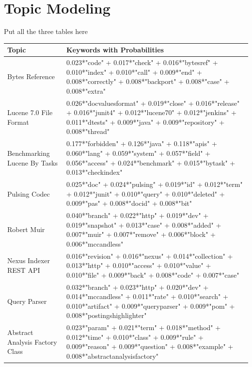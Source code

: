 \documentclass[a4paper,12pt,twoside]{report}
\begin{document}
\section{Topic Modeling}
Put all the three tables here

\begin{table} %
    \centering
    \begin{adjustbox}{max width=\columnwidth}
    \def\arraystretch{1} %
    \begin{tabular}{p{3cm} p{12cm}}
        \toprule
        \textbf{Topic} & \textbf{Keywords with Probabilities}\\
        \midrule
			Bytes Reference & 0.023*"code" + 0.017*"check" + 0.016*"bytesref" + 0.010*"index" + 0.010*"call" + 0.009*"end" + 0.008*"correctly" + 0.008*"backport" + 0.008*"case" + 0.008*"extra" \\
			\midrule 
			Lucene 7.0 File Format & 0.026*"docvaluesformat" + 0.019*"close" + 0.016*"release" + 0.016*"junit4" + 0.012*"lucene70" + 0.012*"jenkins" + 0.011*"dtests" + 0.009*"java" + 0.009*"repository" + 0.008*"thread" \\ 
			\midrule 
			Benchmarking Lucene By Tasks & 0.177*"forbidden" + 0.126*"java" + 0.118*"apis" + 0.060*"lang" + 0.059*"system" + 0.057*"field" + 0.056*"access" + 0.024*"benchmark" + 0.015*"bytask" + 0.013*"checkindex" \\
			\midrule 
			Pulsing Codec & 0.025*"doc" + 0.024*"pulsing" + 0.019*"id" + 0.012*"term" + 0.012*"junit" + 0.010*"query" + 0.010*"deleted" + 0.009*"pas" + 0.008*"docid" + 0.008*"bit" \\
			\midrule 
			Robert Muir & 0.040*"branch" + 0.022*"http" + 0.019*"dev" + 0.019*"snapshot" + 0.013*"case" + 0.008*"added" + 0.007*"muir" + 0.007*"remove" + 0.006*"block" + 0.006*"mccandless" \\
			\midrule 
			Nexus Indexer REST API & 0.016*"revision" + 0.016*"nexus" + 0.014*"collection" + 0.013*"http" + 0.010*"access" + 0.010*"value" + 0.010*"file" + 0.009*"back" + 0.008*"code" + 0.007*"case" \\
			\midrule 
			Query Parser & 0.032*"branch" + 0.023*"http" + 0.020*"dev" + 0.014*"mccandless" + 0.011*"rate" + 0.010*"search" + 0.010*"artifact" + 0.009*"queryparser" + 0.009*"pom" + 0.008*"postingshighlighter" \\
			\midrule 
			Abstract Analysis Factory Class & 0.023*"param" + 0.021*"term" + 0.018*"method" + 0.012*"time" + 0.010*"class" + 0.009*"rule" + 0.009*"reason" + 0.009*"question" + 0.008*"example" + 0.008*"abstractanalysisfactory" \\

\end{tabular}
\end{adjustbox}
\end{table}
\end{document}
